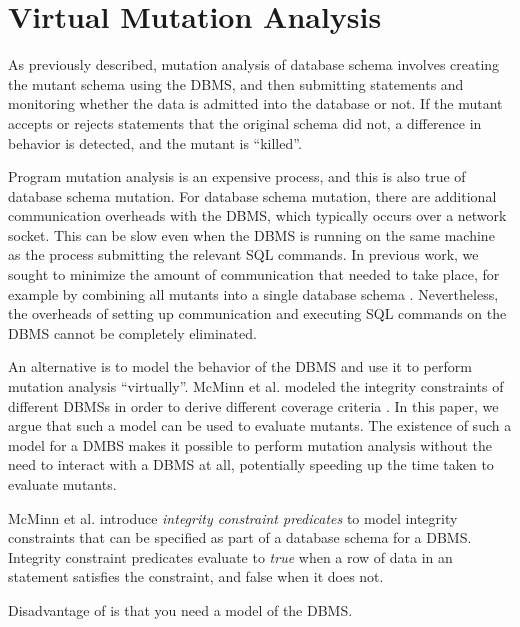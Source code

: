 
\section{Virtual Mutation Analysis}
\label{sec:virtual-mutation-analysis}

As previously described, mutation analysis of database schema involves creating the mutant schema using the DBMS, and then submitting \INSERT statements and monitoring whether the data is admitted into the database or not. If the mutant accepts or rejects \INSERT statements that the original schema did not, a difference in behavior is detected, and the mutant is ``killed''.

Program mutation analysis is an expensive process, and this is also true of database schema mutation. For database schema mutation, there are additional communication overheads with the DBMS, which typically occurs over a network socket. This can be slow even when the DBMS is running on the same machine as the process submitting the relevant SQL commands. 
In previous work, we sought to minimize the amount of communication that needed to take place, for example by combining all mutants into a single database schema \cite{Wright2013}. 
Nevertheless, the overheads of setting up communication and executing SQL commands on the DBMS cannot be completely eliminated.

An alternative is to model the behavior of the DBMS and use it to perform mutation analysis ``virtually''. McMinn et al. modeled the integrity constraints of different DBMSs in order to derive different coverage criteria \cite{McMinn2015}. In this paper, we argue that such a model can be used to evaluate mutants. The existence of such a model for a DMBS makes it possible to perform mutation analysis without the need to interact with a DBMS at all, potentially speeding up the time taken to evaluate mutants.

McMinn et al. introduce {\it integrity constraint predicates} to model integrity constraints that can be specified as part of a database schema for a DBMS. Integrity constraint predicates evaluate to {\it true} when a row of data in an \INSERT statement satisfies the constraint, and false when it does not.





Disadvantage of \VMA is that you need a model of the DBMS.

